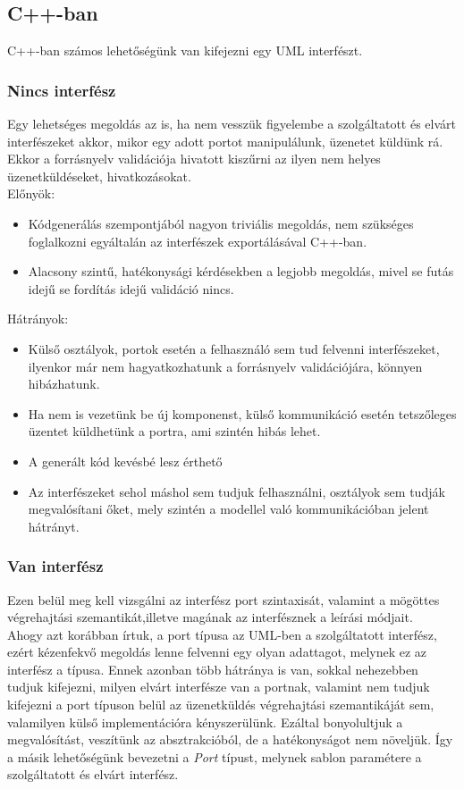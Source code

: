 \documentclass[a4paper,12pt]{report}
\begin{document}
\subsection{C++-ban}
C++-ban számos lehetőségünk van kifejezni egy UML interfészt.
\subsubsection{Nincs interfész}
Egy lehetséges megoldás az is, ha nem vesszük figyelembe a szolgáltatott és elvárt interfészeket akkor, mikor egy adott portot manipulálunk, üzenetet küldünk rá. Ekkor a forrásnyelv validációja hivatott kiszűrni az ilyen nem helyes üzenetküldéseket, hivatkozásokat. \\
Előnyök:
\begin{itemize}
\item Kódgenerálás szempontjából nagyon triviális megoldás, nem szükséges foglalkozni egyáltalán az interfészek exportálásával C++-ban.
\item Alacsony szintű, hatékonysági kérdésekben a legjobb megoldás, mivel se futás idejű se fordítás idejű validáció nincs. 
\end{itemize}
Hátrányok:
\begin{itemize}
\item Külső osztályok, portok esetén a felhasználó sem tud felvenni interfészeket, ilyenkor már nem hagyatkozhatunk a forrásnyelv validációjára, könnyen hibázhatunk.
\item Ha nem is vezetünk be új komponenst, külső kommunikáció esetén tetszőleges üzentet küldhetünk a portra, ami szintén hibás lehet.
\item A generált kód kevésbé lesz érthető
\item Az interfészeket sehol máshol sem tudjuk felhasználni, osztályok sem tudják megvalósítani őket, mely szintén a modellel való kommunikációban jelent hátrányt. 
\end{itemize}

\subsubsection{Van interfész}
Ezen belül meg kell vizsgálni az interfész port szintaxisát, valamint a mögöttes végrehajtási szemantikát,illetve magának az interfésznek a leírási módjait. \\
Ahogy azt korábban írtuk, a port típusa az UML-ben a szolgáltatott interfész, ezért kézenfekvő megoldás lenne felvenni egy olyan adattagot, melynek ez az interfész a típusa. Ennek azonban több hátránya is van, sokkal nehezebben tudjuk kifejezni, milyen elvárt interfésze van a portnak, valamint nem tudjuk kifejezni a port típuson belül az üzenetküldés végrehajtási szemantikáját sem, valamilyen külső implementációra kényszerülünk. Ezáltal bonyolultjuk a megvalósítást, veszítünk az absztrakcióból, de a hatékonyságot nem növeljük. 
Így a másik lehetőségünk bevezetni a \textit{Port} típust, melynek sablon paramétere a szolgáltatott és elvárt interfész. \\
\end{document}
